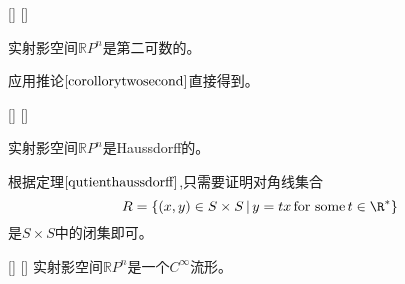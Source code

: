 \documentclass[UTF8]{ctexart}
\begin{document}
    \begin{crl}
        []
        {}
        []
        []

        实射影空间$\mathbb{R}P^n$是第二可数的。
    \end{crl}

    \begin{prf}
        
        
        
        

        应用推论$\ref{corollorytwosecond}$直接得到。
    \end{prf}

    \begin{crl}
        []
        {}
        []
        []

        实射影空间$\mathbb{R}P^n$是Haussdorff的。
    \end{crl}

    \begin{prf}
        
        
        
        

        根据定理$\ref{qutienthaussdorff}$,只需要证明对角线集合
        \[
            R = \{(x,y) \in S \times S \, | \,  y = tx \, \text{for some} \, t \in \R^{*} \}
        \]
        是$S \times S$中的闭集即可。
    \end{prf}

    \begin{thm}
        []
        {}
        []
        []
        实射影空间$\mathbb{R}P^n$是一个$C^{\infty}$流形。
    \end{thm}
\end{document}
